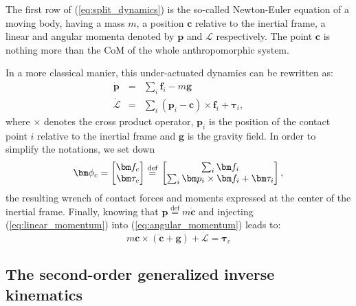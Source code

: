 The first row of (\ref{eq:split_dynamics}) is the so-called Newton-Euler equation of a moving body, having a mass $m$, a position $\bm c$ relative to the inertial frame, a linear and angular momenta denoted by $\bm p$ and $\mathcal{L}$ respectively. The point $\bm c$ is nothing more than the CoM of the whole anthropomorphic system.

In a more classical manier, this under-actuated dynamics can be rewritten as:
\begin{eqnarray}
  \dot{\bm p} &=& \sum_{i} \bm f_{i} - m \bm g \label{eq:linear_momentum}\\
  \dot {\mathcal{L}} & = & \sum_{i} (\bm p_{i} - \bm c) \times \bm f_{i} + \bm \tau_{i} \label{eq:angular_momentum},
\end{eqnarray}
where $\times$ denotes the cross product operator, $\bm p_{i}$ is the position of the contact point $i$ relative to the inertial frame and $\bm g$ is the gravity field. In order to simplify the notations, we set down
\begin{equation}
  \bm \phi_{c} = \begin{bmatrix} \bm f_{c} \\ \bm \tau_{c} \end{bmatrix} \overset{\text{def}}{=} \\ \begin{bmatrix} \sum_{i} \bm f_{i} \\ \sum_{i} \bm p_{i} \times \bm f_{i} + \bm \tau_{i} \end{bmatrix},
  \label{eq:contact_wrench}
\end{equation}
the resulting wrench of contact forces and moments expressed at the center of the inertial frame.
Finally, knowing that $\bm p \overset{\text{def}}{=} m \dot{\bm c}$ and injecting (\ref{eq:linear_momentum}) into (\ref{eq:angular_momentum}) leads to:
\begin{equation}
  m \bm c \times (\ddot{\bm c} + \bm g) + \dot {\mathcal{L}} =  \mathcal{\bm \tau}_{c}
  \label{eq:angular_momentum2}
\end{equation}

\subsection{The second-order generalized inverse kinematics}
